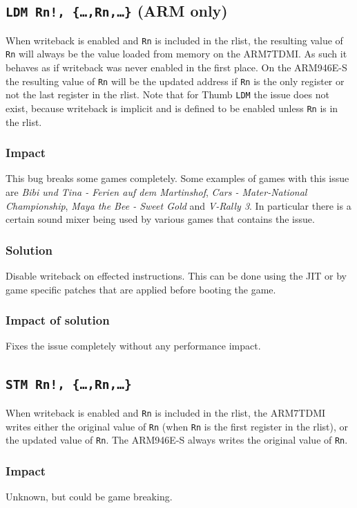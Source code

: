 \documentclass[a4paper,10pt]{report}
\begin{document}
	\subsection{\texttt{LDM Rn!, \{\dots,Rn,\dots\}} (ARM only)}
	When writeback is enabled and \texttt{Rn} is included in the rlist, the resulting value of \texttt{Rn} will always be the value loaded from memory on the ARM7TDMI. As such it behaves as if writeback was never enabled in the first place. On the ARM946E-S the resulting value of \texttt{Rn} will be the updated address if \texttt{Rn} is the only register or not the last register in the rlist. Note that for Thumb \texttt{LDM} the issue does not exist, because writeback is implicit and is defined to be enabled unless \texttt{Rn} is in the rlist.
	
	\subsubsection{Impact}
	This bug breaks some games completely. Some examples of games with this issue are \textit{Bibi und Tina - Ferien auf dem Martinshof}, \textit{Cars - Mater-National Championship}, \textit{Maya the Bee - Sweet Gold} and \textit{V-Rally 3}. In particular there is a certain sound mixer being used by various games that contains the issue.
	
	\subsubsection{Solution}
	Disable writeback on effected instructions. This can be done using the JIT or by game specific patches that are applied before booting the game.
	
	\subsubsection{Impact of solution}
	Fixes the issue completely without any performance impact.
	
	\subsection{\texttt{STM Rn!, \{\dots,Rn,\dots\}}}
	When writeback is enabled and \texttt{Rn} is included in the rlist, the ARM7TDMI writes either the original value of \texttt{Rn} (when \texttt{Rn} is the first register in the rlist), or the updated value of \texttt{Rn}. The ARM946E-S always writes the original value of \texttt{Rn}.
	
	\subsubsection{Impact}
	Unknown, but could be game breaking.
	
\end{document}
